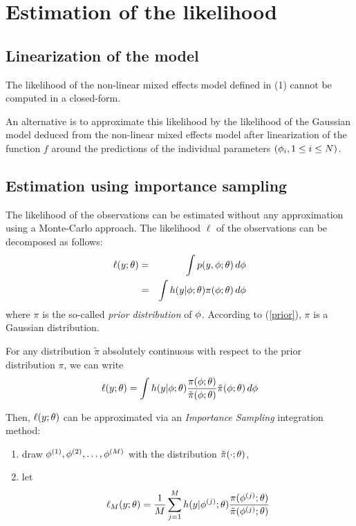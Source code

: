 \section{Estimation of the likelihood} \label{estilik}
\subsection{Linearization of the model}
The likelihood of the non-linear mixed effects model defined in (1) cannot be computed in a closed-form.

An alternative is  to approximate this likelihood  by the likelihood of the Gaussian model deduced from the non-linear mixed
effects model after linearization of the function $f$ around
the predictions of the individual parameters $({{\phi}_i}, 1\leq i \leq N) $.

\subsection{Estimation using importance sampling}

The likelihood of the observations can be estimated without any approximation using a Monte-Carlo approach. The likelihood $\ell$ of the observations can be decomposed as follows:
\begin{eqnarray*}
 \ell(y;{\theta}) &=& \int p(y,{\phi};{\theta})\,d{\phi} \\
&=& \int h(y|{\phi};{\theta})\pi({\phi};{\theta})\,d{\phi}
\end{eqnarray*}
where $\pi$ is the so-called {\it prior distribution} of ${\phi}$. According to (\ref{prior}), $\pi$ is a Gaussian distribution.

For any distribution $\tilde{\pi}$ absolutely continuous with respect to the prior distribution $\pi$, we can write
$$
\ell(y;{\theta}) = \int h(y|{\phi};{\theta}) \frac {\pi({\phi};{\theta})}{
\tilde{\pi}({\phi};{\theta}) }  \tilde{\pi}({\phi};{\theta}) \,d{\phi}
$$


Then, $\ell(y;{\theta})$ can be approximated via an {\it Importance Sampling} integration method:
\begin{enumerate}
\item draw ${\phi}^{(1)} ,{\phi}^{(2)} ,\ldots,{\phi}^{(M)} $ with the distribution $\tilde{\pi}(\cdot;{\theta})$,
\item let
\begin{equation} \label{islike}
 \ell_M(y;{\theta}) =\frac{1}{M} \sum_{j=1}^{M} h(y|{\phi}^{(j)};{\theta} )\frac{\pi( {\phi}^{(j)} ;{\theta})}{ \tilde{\pi}({\phi}^{(j)} ;{\theta}) }
\end{equation}
\end{enumerate}

